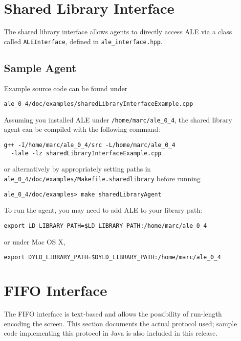 \documentclass[12pt]{article}
\begin{document}
\section{Shared Library Interface}\label{sec:shared_library_interface}

The shared library interface allows agents to directly access ALE via a class called
\verb+ALEInterface+, defined in \verb+ale_interface.hpp+. 

\subsection{Sample Agent}

Example source code can be found under

\begin{verbatim}
ale_0_4/doc/examples/sharedLibraryInterfaceExample.cpp
\end{verbatim}

Assuming you installed ALE under \verb+/home/marc/ale_0_4+, the shared library agent can be 
compiled with the following command: 

\begin{verbatim}
g++ -I/home/marc/ale_0_4/src -L/home/marc/ale_0_4 
  -lale -lz sharedLibraryInterfaceExample.cpp 
\end{verbatim}

or alternatively by appropriately setting paths in \verb+ale_0_4/doc/examples/Makefile.sharedlibrary+ before running 

\begin{verbatim}
ale_0_4/doc/examples> make sharedLibraryAgent
\end{verbatim}

To run the agent, you may need to add ALE to your library path:

\begin{verbatim}
export LD_LIBRARY_PATH=$LD_LIBRARY_PATH:/home/marc/ale_0_4
\end{verbatim}

or under Mac OS X,

\begin{verbatim}
export DYLD_LIBRARY_PATH=$DYLD_LIBRARY_PATH:/home/marc/ale_0_4
\end{verbatim}

\section{FIFO Interface}\label{sec:pipes_interface}

The FIFO interface is text-based and allows the possibility of run-length encoding the screen. This section documents the actual protocol used; sample code implementing this protocol in Java is also included in this release.
\end{document}
